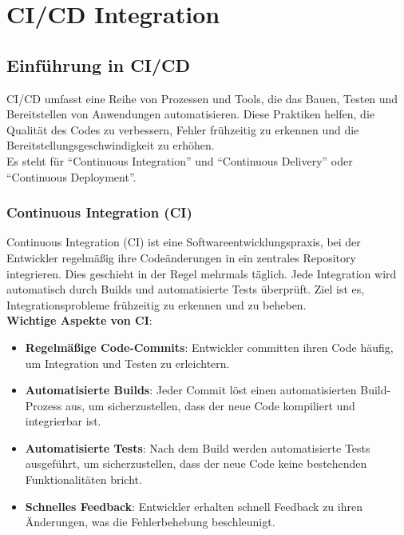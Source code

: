 \chapter{CI/CD Integration}
\section{Einführung in CI/CD}
CI/CD umfasst eine Reihe von Prozessen und Tools, die das Bauen, Testen und Bereitstellen von Anwendungen automatisieren. Diese Praktiken helfen, die Qualität des Codes zu verbessern, Fehler frühzeitig zu erkennen und die Bereitstellungsgeschwindigkeit zu erhöhen.\\
Es steht für \enquote{Continuous Integration} und \enquote{Continuous Delivery} oder \enquote{Continuous Deployment}.
\subsection{Continuous Integration (CI)}
Continuous Integration (CI) ist eine Softwareentwicklungspraxis, bei der Entwickler regelmäßig ihre Codeänderungen in ein zentrales Repository integrieren. Dies geschieht in der Regel mehrmals täglich. Jede Integration wird automatisch durch Builds und automatisierte Tests überprüft. Ziel ist es, Integrationsprobleme frühzeitig zu erkennen und zu beheben.\\
\textbf{Wichtige Aspekte von CI}:
\begin{itemize}
    \item \textbf{Regelmäßige Code-Commits}: Entwickler committen ihren Code häufig, um Integration und Testen zu erleichtern.
    \item \textbf{Automatisierte Builds}: Jeder Commit löst einen automatisierten Build-Prozess aus, um sicherzustellen, dass der neue Code kompiliert und integrierbar ist.
    \item \textbf{Automatisierte Tests}: Nach dem Build werden automatisierte Tests ausgeführt, um sicherzustellen, dass der neue Code keine bestehenden Funktionalitäten bricht.
    \item \textbf{Schnelles Feedback}: Entwickler erhalten schnell Feedback zu ihren Änderungen, was die Fehlerbehebung beschleunigt.
\end{itemize}

